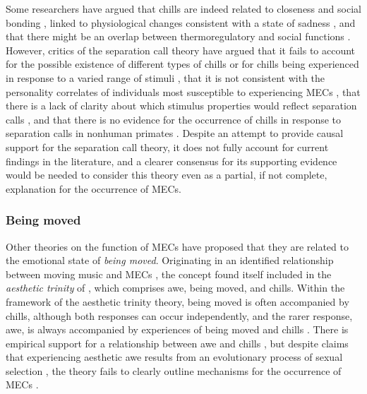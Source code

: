 Some researchers have argued that chills are indeed related to closeness and social bonding \parencite{beriachvili2016, bicknell2007, maruskin2012, schoeller2019a}, linked to physiological changes consistent with a state of sadness \parencite{benedek2011}, and that there might be an overlap between thermoregulatory and social functions \parencite[for a brief review, see][]{bannister2019}. However, critics of the separation call theory have argued that it fails to account for the possible existence of different types of chills \parencites{levinson2006}[see also][]{bannister2019, maruskin2012} or for chills being experienced in response to a varied range of stimuli \parencite{beriachvili2016, sachs2018}, that it is not consistent with the personality correlates of individuals most susceptible to experiencing MECs \parencite{mccrae2007}, that there is a lack of clarity about which stimulus properties would reflect separation calls \parencite{bannister2020a}, and that there is no evidence for the occurrence of chills in response to separation calls in nonhuman primates \parencite{altenmuller2013}. Despite an attempt to provide causal support \parencite[briefly described in][pp. 143--144]{panksepp2002} for the separation call theory, it does not fully account for current findings in the literature, and a clearer consensus for its supporting evidence would be needed to consider this theory even as a partial, if not complete, explanation for the occurrence of MECs.

\subsubsection{Being moved}

Other theories on the function of MECs have proposed that they are related to the emotional state of \emph{being moved}. Originating in an identified relationship between moving music and MECs \parencite{goldstein1980, panksepp1995, panksepp2002}, the concept found itself included in the \emph{aesthetic trinity} of \textcite{konecni2005}, which comprises awe, being moved, and chills. Within the framework of the aesthetic trinity theory, being moved is often accompanied by chills, although both responses can occur independently, and the rarer response, awe, is always accompanied by experiences of being moved and chills \parencite{konecni2005, konecni2007a, konecni2007b, konecni2008, konecni2013}. There is empirical support for a relationship between awe and chills \parencite{cotter2018, ji2019, maruskin2012, quesnel2018, schurtz2012, silvia2015}, but despite claims that experiencing aesthetic awe results from an evolutionary process of sexual selection \parencite{konecni2005}, the theory fails to clearly outline mechanisms for the occurrence of MECs \parencite{beriachvili2016, brankovic2013}.

